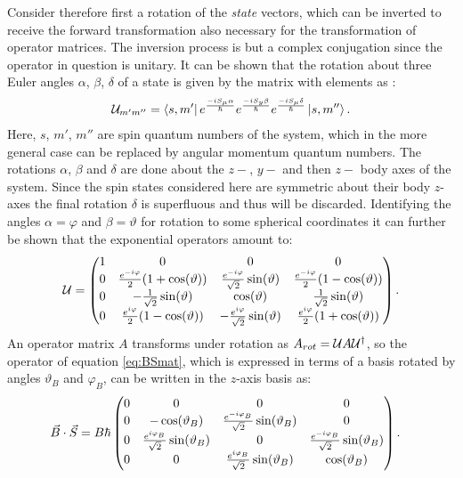 \documentclass[a4paper]{article}
\begin{document}
Consider therefore first a rotation of the \textit{state} vectors, which can 
be inverted to receive the forward transformation also necessary for the transformation
of operator matrices. The inversion process is but a complex
conjugation since the operator in question is unitary. It can be shown 
that the rotation about three Euler angles \(\alpha\), \(\beta\), \(\delta\) of a state is
given  by the matrix with elements as \cite{sakurai}:
\begin{align*}
        \mathbb{\cal U}_{m'm''} = \bra{s,
        m'}e^{\frac{-iS_\mu\alpha}{\hbar}}e^{\frac{-iS_y\beta}{\hbar}}e^{\frac{-iS_\mu\delta}{\hbar{}}}\ket{s,
m''}
.\end{align*}
Here, \(s\), \(m'\), \(m''\) are spin quantum numbers of the system, which in the more general
case can be replaced by angular momentum quantum numbers. The rotations \(\alpha\),
\(\beta\) and \(\delta\) are done about the \(z-\), \(y-\) and then \(z-\) body axes of
the system. Since the spin states considered here are symmetric about their
body \(z\)-axes the final rotation \(\delta\) is superfluous and thus will be discarded.
Identifying the angles \(\alpha = \varphi\) and \(\beta = \vartheta\) for rotation to some
spherical coordinates it can further be
shown that the exponential operators amount to:
\begin{align*}
        \U = \pmqty{
        1 & 0 & 0 & 0\\
        0 & \frac{e^{-i\varphi}}{2}(1+\cos(\vartheta)) &
        \frac{e^{-i\varphi}}{\sqrt{2}}\sin(\vartheta) &
        \frac{e^{-i\varphi}}{2}(1-\cos(\vartheta))\\
        0 & -\frac{1}{\sqrt{2}}\sin(\vartheta) & \cos(\vartheta) & \frac{1}{\sqrt{2} }
        \sin(\vartheta)\\
        0 & \frac{e^{i\varphi}}{2}(1-\cos(\vartheta)) &
        -\frac{e^{i\varphi}}{\sqrt{2}}\sin(\vartheta) & \frac{e^{i\varphi}}{2}(1 +
        \cos(\vartheta))
}
.\end{align*}
An operator matrix \(A\) transforms under rotation as \(A_{rot} = \mathbb{\cal U} A\mathbb{\cal U}^{\dagger}\), so
the operator of equation \ref{eq:BSmat}, which is expressed in terms of a basis rotated by
angles \(\vartheta_B\) and \(\varphi_B\), can be written in the \(z\)-axis basis as:
\begin{align}\label{eq:BSrot}
    \va{B}\cdot \va{S} &= B\hbar{}\pmqty{
            0 & 0 & 0 & 0\\
            0 & -\cos(\vartheta_B) & \frac{e^{-i\varphi_B}}{\sqrt{2} }\sin(\vartheta_B) & 0\\
                    0 & \frac{e^{i\varphi_B}}{\sqrt{2} }\sin(\vartheta_B) & 0 &
                    \frac{e^{-i\varphi_B}}{\sqrt{2} }\sin(\vartheta_B)\\
                    0 & 0 & \frac{e^{i\varphi_B}}{\sqrt{2} }\sin(\vartheta_B) & \cos(\vartheta_B)
            }
.\end{align}
\end{document}
